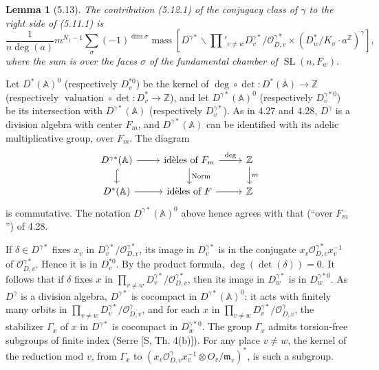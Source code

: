 \documentclass[10pt]{article}
\newcommand{\Z}{\mathbb Z}
\newcommand{\Adele}{\mathbb A}
\newcommand{\SL}{\operatorname{SL}}
\newcommand{\val}{\operatorname{valuation}}
\newcommand{\degm}{\operatorname{deg}}
\newcommand{\mass}{\operatorname{mass}}
\theoremstyle{deligne}
\newtheorem*{lemma*}{Lemma}
\newcommand{\heading}[1]{\vspace{0.7em}\noindent{\bfseries #1}\quad}
\begin{document}
\begin{lemma*}[5.13]
The contribution (5.12.1) of the conjugacy class of $\gamma$ to the right side of (5.11.1) is
\begin{equation}\tag{5.13.1}
\frac{1}{n\degm(a)}m^{N_1-1}\sum_\sigma(-1)^{\dim\sigma}
\mass\left[D^{\gamma *}\backslash \prod'_{v\ne w}D_v^{\gamma *}/\mathcal O_{D,v}^{\gamma *}\times(D_w^*/K_\sigma\cdot a^\Z)^\gamma\right],
\end{equation}
where the sum is over the faces $\sigma$ of the fundamental chamber of $\SL(n,F_w)$.
\end{lemma*}

\heading{5.14.} Let $D^*(\Adele)^0$ (respectively $D_v^{*0}$) be the kernel of $\degm\circ\det:D^*(\Adele)\to\Z$ (respectively $\val\circ\det:D_v^*\to\Z$), and let $D^{\gamma *}(\Adele)^0$ (respectively $D_v^{\gamma *0}$) be its intersection with $D^{\gamma *}(\Adele)$ (respectively $D_v^{\gamma *}$). As in 4.27 and 4.28, $D^\gamma$ is a division algebra with center $F_m$, and $D^{\gamma *}(\Adele)$ can be identified with its adelic multiplicative group, over $F_m$. The diagram
\[
\begin{tikzcd}[column sep=2.4em,row sep=1.5em]
D^{\gamma *}(\Adele) \arrow[r] \arrow[d,hook] & \hbox{id\`eles of }F_m \arrow[r,"\degm"] \arrow[d,"\mathrm{Norm}"] & \Z \arrow[d,"m"]\\
D^*(\Adele) \arrow[r] & \hbox{id\`eles of }F \arrow[r] & \Z
\end{tikzcd}
\]
is commutative. The notation $D^{\gamma *}(\Adele)^0$ above hence agrees with that (``over $F_m$'') of 4.28.

If $\delta\in D^{\gamma *}$ fixes $x_v$ in $D_v^{\gamma *}/\mathcal O_{D,v}^{\gamma *}$, its image in $D_v^{\gamma *}$ is in the conjugate $x_v\mathcal O_{D,v}^{\gamma *}x_v^{-1}$ of $\mathcal O_{D,v}^{\gamma *}$. Hence it is in $D_v^{*0}$. By the product formula, $\degm(\det(\delta))=0$. It follows that if $\delta$ fixes $x$ in $\prod_{v\ne w}D_v^{\gamma *}/\mathcal O_{D,v}^{\gamma *}$, then its image in $D_w^{\gamma *}$ is in $D_w^{\gamma *0}$. As $D^\gamma$ is a division algebra, $D^{\gamma *}$ is cocompact in $D^{\gamma *}(\Adele)^0$: it acts with finitely many orbits in $\prod_{v\ne w}D_v^{\gamma *}/\mathcal O_{D,v}^\gamma$, and for each $x$ in $\prod_{v\ne w}D_v^{\gamma *}/\mathcal O_{D,v}^\gamma$, the stabilizer $\Gamma_x$ of $x$ in $D^{\gamma *}$ is cocompact in $D_w^{\gamma *0}$. The group $\Gamma_x$ admits torsion-free subgroups of finite index (Serre [S, Th. 4(b)]). For any place $v\ne w$, the kernel of the reduction mod $v$, from $\Gamma_x$ to $(x_v\mathcal O_{D,v}^{\gamma} x_v^{-1}\otimes O_v/\mathfrak m_v)^*$, is such a subgroup.
\end{document}
